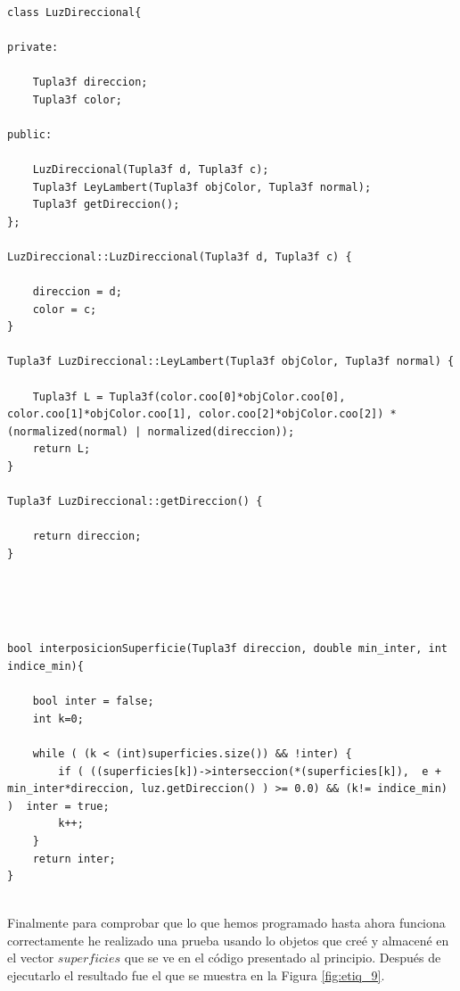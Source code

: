 \begin{lstlisting}[style=Consola]

class LuzDireccional{

private:

	Tupla3f direccion;
	Tupla3f color;

public:

	LuzDireccional(Tupla3f d, Tupla3f c);
	Tupla3f LeyLambert(Tupla3f objColor, Tupla3f normal);
	Tupla3f getDireccion();
};

LuzDireccional::LuzDireccional(Tupla3f d, Tupla3f c) {

	direccion = d;
	color = c;
}

Tupla3f LuzDireccional::LeyLambert(Tupla3f objColor, Tupla3f normal) {

	Tupla3f L = Tupla3f(color.coo[0]*objColor.coo[0], color.coo[1]*objColor.coo[1], color.coo[2]*objColor.coo[2]) * (normalized(normal) | normalized(direccion));
	return L;
}

Tupla3f LuzDireccional::getDireccion() {

	return direccion;
}


\end{lstlisting}
${ }$\\

\begin{lstlisting}[style=Consola]

bool interposicionSuperficie(Tupla3f direccion, double min_inter, int indice_min){

	bool inter = false;
	int k=0;

	while ( (k < (int)superficies.size()) && !inter) {
		if ( ((superficies[k])->interseccion(*(superficies[k]),  e + min_inter*direccion, luz.getDireccion() ) >= 0.0) && (k!= indice_min) )  inter = true;
		k++;
	}
	return inter;
}
\end{lstlisting}
	${ }$\\


Finalmente para comprobar que lo que hemos programado hasta ahora funciona correctamente he realizado una prueba usando lo objetos que creé y almacené en el vector $superficies$ que se ve en el código presentado al principio. Después de ejecutarlo el resultado fue el que se muestra en la Figura \ref{fig:etiq_9}.
${ }$\\

